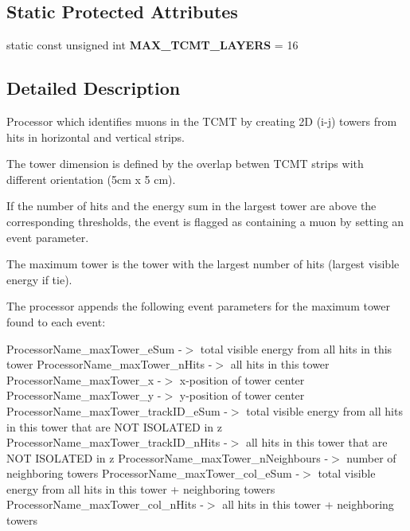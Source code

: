 \subsection*{Static Protected Attributes}
\begin{DoxyCompactItemize}
\item 
static const unsigned int {\bfseries M\-A\-X\-\_\-\-T\-C\-M\-T\-\_\-\-L\-A\-Y\-E\-R\-S} = 16\label{classCALICE_1_1TcmtMuonTracker_a34a47144d814ad6080e2ae513f53be68}

\end{DoxyCompactItemize}


\subsection{Detailed Description}
Processor which identifies muons in the T\-C\-M\-T by creating 2\-D (i-\/j) towers from hits in horizontal and vertical strips.

The tower dimension is defined by the overlap betwen T\-C\-M\-T strips with different orientation (5cm x 5 cm).

If the number of hits and the energy sum in the largest tower are above the corresponding thresholds, the event is flagged as containing a muon by setting an event parameter.

The maximum tower is the tower with the largest number of hits (largest visible energy if tie).

The processor appends the following event parameters for the maximum tower found to each event\-:

Processor\-Name\-\_\-max\-Tower\-\_\-e\-Sum -\/$>$ total visible energy from all hits in this tower Processor\-Name\-\_\-max\-Tower\-\_\-n\-Hits -\/$>$ all hits in this tower Processor\-Name\-\_\-max\-Tower\-\_\-x -\/$>$ x-\/position of tower center Processor\-Name\-\_\-max\-Tower\-\_\-y -\/$>$ y-\/position of tower center Processor\-Name\-\_\-max\-Tower\-\_\-track\-I\-D\-\_\-e\-Sum -\/$>$ total visible energy from all hits in this tower that are N\-O\-T I\-S\-O\-L\-A\-T\-E\-D in z Processor\-Name\-\_\-max\-Tower\-\_\-track\-I\-D\-\_\-n\-Hits -\/$>$ all hits in this tower that are N\-O\-T I\-S\-O\-L\-A\-T\-E\-D in z Processor\-Name\-\_\-max\-Tower\-\_\-n\-Neighbours -\/$>$ number of neighboring towers Processor\-Name\-\_\-max\-Tower\-\_\-col\-\_\-e\-Sum -\/$>$ total visible energy from all hits in this tower + neighboring towers Processor\-Name\-\_\-max\-Tower\-\_\-col\-\_\-n\-Hits -\/$>$ all hits in this tower + neighboring towers

